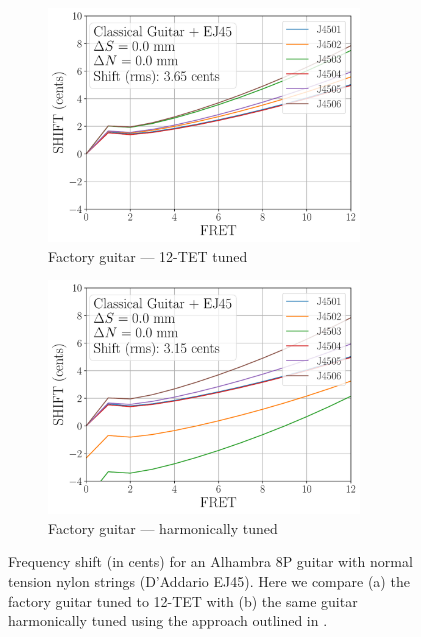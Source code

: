 
 \begin{figure}
  \centering
  \begin{subfigure}[b]{0.45\textwidth}
   \centering
   \includegraphics[width=3.25in]{../figures/shift_classicalguitar_ej45_factory}
   \caption{Factory guitar --- 12-TET tuned}
   \label{fig:shift_classicalguitar_ej45_fact_temp}
  \end{subfigure}
  \hspace{0.25in}
  \begin{subfigure}[b]{0.45\textwidth}
   \centering
   \includegraphics[width=3.25in]{../figures/shift_classicalguitar_ej45_harmonic}
   \caption{Factory guitar --- harmonically tuned}
   \label{fig:shift_classicalguitar_ej45_harmonic}
  \end{subfigure}
  \caption{\label{fig:compensation_classicalguitar_ej45_temp} Frequency shift (in cents) for an Alhambra 8P guitar with normal tension nylon strings (D'Addario EJ45). Here we compare (a) the factory guitar tuned to 12-TET with (b) the same guitar harmonically tuned using the approach outlined in .}
 \end{figure}


